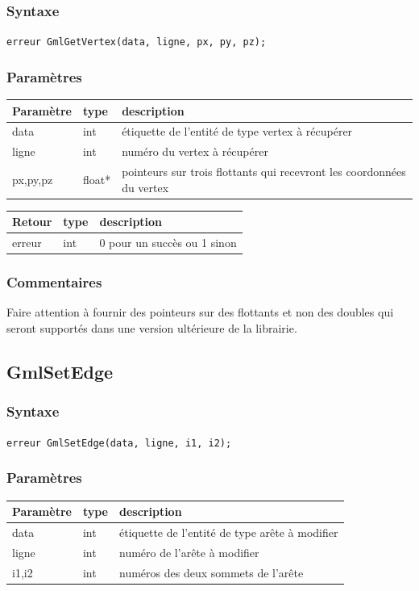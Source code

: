 \documentclass[a4paper,12pt]{article}
\begin{document}
\subsubsection*{Syntaxe}
{\tt erreur GmlGetVertex(data, ligne, px, py, pz);}
\subsubsection*{Paramètres}

\begin{tabular}{|m{2cm}|m{1.5cm}|m{10.5cm}|}
\hline
Paramètre  & type   & description \\
\hline
data       & int    & étiquette de l'entité de type vertex à récupérer \\
\hline
ligne      & int    & numéro du vertex à récupérer \\
\hline
px,py,pz   & float* & pointeurs sur trois flottants qui recevront les coordonnées du vertex \\
\hline
\end{tabular}

\medskip

\begin{tabular}{|m{2cm}|m{1.5cm}|m{10.5cm}|}
\hline
Retour     & type   & description \\
\hline
erreur     & int    & 0 pour un succès ou 1 sinon \\
\hline
\end{tabular}
\subsubsection*{Commentaires}
Faire attention à fournir des pointeurs sur des flottants et non des doubles qui seront supportés dans une version ultérieure de la librairie.


\subsection{GmlSetEdge}
\subsubsection*{Syntaxe}
{\tt erreur GmlSetEdge(data, ligne, i1, i2);}
\subsubsection*{Paramètres}

\begin{tabular}{|m{2cm}|m{1.5cm}|m{10.5cm}|}
\hline
Paramètre  & type   & description \\
\hline
data       & int    & étiquette de l'entité de type arête à modifier \\
\hline
ligne      & int    & numéro de l'arête à modifier \\
\hline
i1,i2      & int    & numéros des deux sommets de l'arête \\
\hline
\end{tabular}
\end{document}
